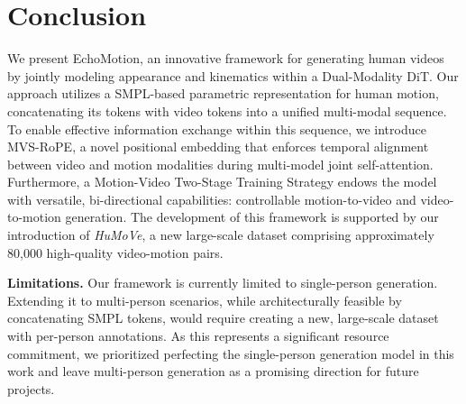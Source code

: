\section{Conclusion}

We present EchoMotion, an innovative framework for generating human videos by jointly modeling appearance and kinematics within a Dual-Modality DiT. Our approach utilizes a SMPL-based parametric representation for human motion, concatenating its tokens with video tokens into a unified multi-modal sequence. To enable effective information exchange within this sequence, we introduce MVS-RoPE, a novel positional embedding that enforces temporal alignment between video and motion modalities during multi-model joint self-attention. 
Furthermore, a Motion-Video Two-Stage Training Strategy endows the model with versatile, bi-directional capabilities: controllable motion-to-video and video-to-motion generation. The development of this framework is supported by our introduction of \textit{HuMoVe}, a new large-scale dataset comprising approximately 80,000 high-quality video-motion pairs.

\textbf{Limitations.} Our framework is currently limited to single-person generation. Extending it to multi-person scenarios, while architecturally feasible by concatenating SMPL tokens, would require creating a new, large-scale dataset with per-person annotations. As this represents a significant resource commitment, we prioritized perfecting the single-person generation model in this work and leave multi-person generation as a promising direction for future projects.
